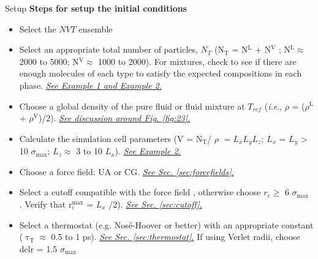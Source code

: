 \documentclass[9pt,bestpractices]{livecoms}
\newcommand{\checkref}[1]{\uline{\emph{{\color{LiveCoMSDarkBlue}#1}}}}
\begin{document}
\begin{Checklists*}[p!]
\begin{checklist}{Setup}
\textbf{Steps for setup the initial conditions}
\begin{itemize}
\item Select the $NVT$ ensemble \\
\item Select an appropriate total number of particles, $N_{T}$ (N$_{\mathrm{T}}$ = N$^{\mathrm{L}}$ + N$^{\mathrm{V}}$ ; N$^{\mathrm{L}}{\approx}$ 2000 to 5000; N$^{\mathrm{V}}{\approx}$ 1000 to 2000). For mixtures, check to see if there are enough molecules of each type to satisfy the expected compositions in each phase. \checkref{See Example 1 and Example 2.} \\
\item Choose a global density of the pure fluid or fluid mixture at $T_{ref}$ (\textit{i.e}., {${\rho}$} = ({${\rho}$}$^{\mathrm{L}}$ + {${\rho}$}$^{\mathrm{V}}$)/2). \checkref{See discussion around Fig. \ref{fig:23}.} \\
\item Calculate the simulation cell parameters (V = N$_{\mathrm{T}}$/ {${\rho}$} $= L_{x}L_{y}L_{z}$; $L_{x}$ = $L_{y}$ {\textgreater} 10 ${\sigma}_{\mathrm{max}}$;  $L_{z}{\approx}$ 3 to 10 $L_{x}$). \checkref{See Example 2.} \\
\item Choose a force field: UA or CG. \checkref{See Sec. \ref{sec:forcefields}.} \\
\item Select a cutoff compatible with the force field , otherwise choose $r_{c}{\geq}$ 6 ${\sigma}_{\mathrm{max}}$ . Verify that r$_{\mathrm{c}}^{\mathrm{max}}$ = $L_{x}$ /2). \checkref{See Sec. \ref{sec:cutoff}.} \\
\item Select a thermostat (e.g. Nos\'e-Hoover or better) with an appropriate constant (${\uptau}_{\mathrm{T}}{\approx}$ 0.5 to 1 ps). \checkref{See Sec. \ref{sec:thermostat}.} If using Verlet radii, choose delr = 1.5 ${\sigma}_{\mathrm{max}}$ \\

\end{itemize}
\end{checklist}
\end{Checklists*}
\end{document}
